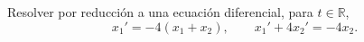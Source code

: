 Resolver por reducción a una ecuación diferencial, para \(t\in\mathbb R\),
\[x_1'=-4(x_1+x_2),\qquad x_1'+4x_2'=-4x_2.\]
